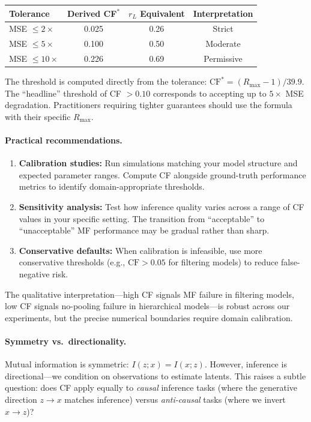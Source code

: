 \documentclass[10pt]{article} %
\theoremstyle{plain}
\theoremstyle{definition}
\begin{document}
\begin{center}
\begin{tabular}{lccc}
\toprule
\textbf{Tolerance} & \textbf{Derived CF$^*$} & \textbf{$r_L$ Equivalent} & \textbf{Interpretation} \\
\midrule
MSE $\leq 2\times$ & 0.025 & 0.26 & Strict \\
MSE $\leq 5\times$ & 0.100 & 0.50 & Moderate \\
MSE $\leq 10\times$ & 0.226 & 0.69 & Permissive \\
\bottomrule
\end{tabular}
\end{center}

The threshold is computed directly from the tolerance: $\text{CF}^* = (R_{\max} - 1)/39.9$. The ``headline'' threshold of CF $> 0.10$ corresponds to accepting up to $5\times$ MSE degradation. Practitioners requiring tighter guarantees should use the formula with their specific $R_{\max}$.

\paragraph{Practical recommendations.}
\begin{enumerate}
    \item \textbf{Calibration studies:} Run simulations matching your model structure and expected parameter ranges. Compute CF alongside ground-truth performance metrics to identify domain-appropriate thresholds.
    \item \textbf{Sensitivity analysis:} Test how inference quality varies across a range of CF values in your specific setting. The transition from ``acceptable'' to ``unacceptable'' MF performance may be gradual rather than sharp.
    \item \textbf{Conservative defaults:} When calibration is infeasible, use more conservative thresholds (e.g., $\text{CF} > 0.05$ for filtering models) to reduce false-negative risk.
\end{enumerate}
The qualitative interpretation---high CF signals MF failure in filtering models, low CF signals no-pooling failure in hierarchical models---is robust across our experiments, but the precise numerical boundaries require domain calibration.

\paragraph{Symmetry vs.\ directionality.} Mutual information is symmetric: $I(z;x) = I(x;z)$. However, inference is directional---we condition on observations to estimate latents. This raises a subtle question: does CF apply equally to \emph{causal} inference tasks (where the generative direction $z \to x$ matches inference) versus \emph{anti-causal} tasks (where we invert $x \to z$)?
\end{document}
